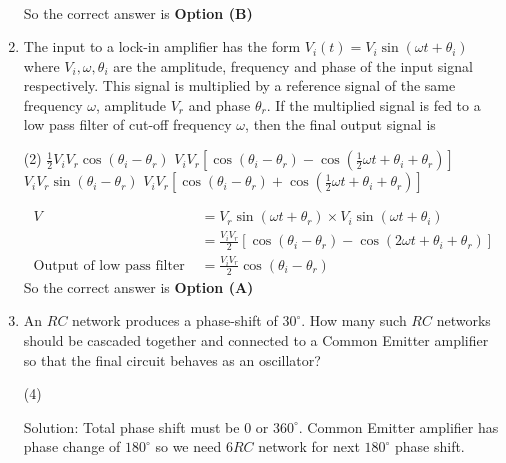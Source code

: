 \begin{enumerate}
\begin{answer}
\begin{align*}
\end{align*}
So the correct answer is \textbf{Option (B)}
\end{answer}
	\item The input to a lock-in amplifier has the form $V_{i}(t)=V_{i} \sin \left(\omega t+\theta_{i}\right)$ where $V_{i}, \omega, \theta_{i}$ are the amplitude, frequency and phase of the input signal respectively. This signal is multiplied by a reference signal of the same frequency $\omega$, amplitude $V_{r}$ and phase $\theta_{r}$. If the multiplied signal is fed to a low pass filter of cut-off frequency $\omega$, then the final output signal is
{	}
\begin{tasks}(2)
\task[\textbf{A.}] $\frac{1}{2} V_{i} V_{r} \cos \left(\theta_{i}-\theta_{r}\right)$
\task[\textbf{B.}] $V_{i} V_{r}\left[\cos \left(\theta_{i}-\theta_{r}\right)-\cos \left(\frac{1}{2} \omega t+\theta_{i}+\theta_{r}\right)\right]$
\task[\textbf{C.}] $V_{i} V_{r} \sin \left(\theta_{i}-\theta_{r}\right)$
\task[\textbf{D.}] $V_{i} V_{r}\left[\cos \left(\theta_{i}-\theta_{r}\right)+\cos \left(\frac{1}{2} \omega t+\theta_{i}+\theta_{r}\right)\right]$
\end{tasks}
\begin{answer}
\begin{align*}
V&=V_{r} \sin \left(\omega t+\theta_{r}\right) \times V_{i} \sin \left(\omega t+\theta_{i}\right)\\&=\frac{V_{i} V_{r}}{2}\left[\cos \left(\theta_{i}-\theta_{r}\right)-\cos \left(2 \omega t+\theta_{i}+\theta_{r}\right)\right]\\
\text{Output of low pass filter }&=\frac{V_{i} V_{r}}{2} \cos \left(\theta_{i}-\theta_{r}\right)
\end{align*}
So the correct answer is \textbf{Option (A)}
\end{answer}
	\item An $R C$ network produces a phase-shift of $30^{\circ}$. How many such $R C$ networks should be cascaded together and connected to a Common Emitter amplifier so that the final circuit behaves as an oscillator?
{	}
\begin{tasks}(4)
\end{tasks}
\begin{answer}$\left. \right. $\\
Solution: Total phase shift must be 0 or $360^{\circ}$. Common Emitter amplifier has phase change of $180^{\circ}$ so we need $6 R C$ network for next $180^{\circ}$ phase shift.\\

\end{answer}
\end{enumerate}
